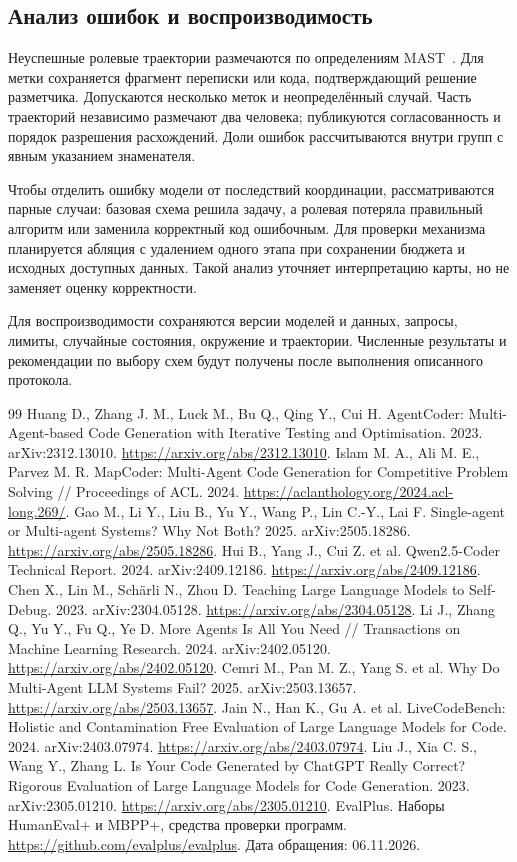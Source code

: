 \documentclass{misisarticle}
\begin{document}
\subsection{Анализ ошибок и воспроизводимость}
Неуспешные ролевые траектории размечаются по определениям MAST~\cite{mast}. Для метки сохраняется фрагмент переписки или кода, подтверждающий решение разметчика. Допускаются несколько меток и неопределённый случай. Часть траекторий независимо размечают два человека; публикуются согласованность и порядок разрешения расхождений. Доли ошибок рассчитываются внутри групп с явным указанием знаменателя.

Чтобы отделить ошибку модели от последствий координации, рассматриваются парные случаи: базовая схема решила задачу, а ролевая потеряла правильный алгоритм или заменила корректный код ошибочным. Для проверки механизма планируется абляция с удалением одного этапа при сохранении бюджета и исходных доступных данных. Такой анализ уточняет интерпретацию карты, но не заменяет оценку корректности.

Для воспроизводимости сохраняются версии моделей и данных, запросы, лимиты, случайные состояния, окружение и траектории. Численные результаты и рекомендации по выбору схем будут получены после выполнения описанного протокола.

\begin{thebibliography}{99}
 Huang D., Zhang J. M., Luck M., Bu Q., Qing Y., Cui H. AgentCoder: Multi-Agent-based Code Generation with Iterative Testing and Optimisation. 2023. arXiv:2312.13010. \url{https://arxiv.org/abs/2312.13010}.
 Islam M. A., Ali M. E., Parvez M. R. MapCoder: Multi-Agent Code Generation for Competitive Problem Solving // Proceedings of ACL. 2024. \url{https://aclanthology.org/2024.acl-long.269/}.
 Gao M., Li Y., Liu B., Yu Y., Wang P., Lin C.-Y., Lai F. Single-agent or Multi-agent Systems? Why Not Both? 2025. arXiv:2505.18286. \url{https://arxiv.org/abs/2505.18286}.
 Hui B., Yang J., Cui Z. et al. Qwen2.5-Coder Technical Report. 2024. arXiv:2409.12186. \url{https://arxiv.org/abs/2409.12186}.
 Chen X., Lin M., Schärli N., Zhou D. Teaching Large Language Models to Self-Debug. 2023. arXiv:2304.05128. \url{https://arxiv.org/abs/2304.05128}.
 Li J., Zhang Q., Yu Y., Fu Q., Ye D. More Agents Is All You Need // Transactions on Machine Learning Research. 2024. arXiv:2402.05120. \url{https://arxiv.org/abs/2402.05120}.
 Cemri M., Pan M. Z., Yang S. et al. Why Do Multi-Agent LLM Systems Fail? 2025. arXiv:2503.13657. \url{https://arxiv.org/abs/2503.13657}.
 Jain N., Han K., Gu A. et al. LiveCodeBench: Holistic and Contamination Free Evaluation of Large Language Models for Code. 2024. arXiv:2403.07974. \url{https://arxiv.org/abs/2403.07974}.
 Liu J., Xia C. S., Wang Y., Zhang L. Is Your Code Generated by ChatGPT Really Correct? Rigorous Evaluation of Large Language Models for Code Generation. 2023. arXiv:2305.01210. \url{https://arxiv.org/abs/2305.01210}.
 EvalPlus. Наборы HumanEval+ и MBPP+, средства проверки программ. \url{https://github.com/evalplus/evalplus}. Дата обращения: 06.11.2026.
\end{thebibliography}
\end{document}
